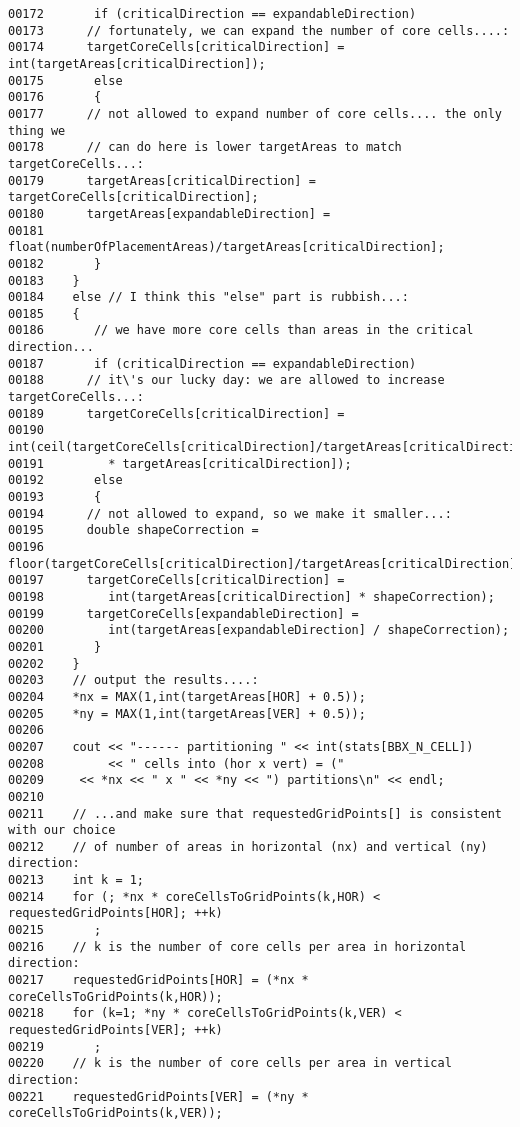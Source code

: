 \begin{verbatim}
00172       if (criticalDirection == expandableDirection)
00173      // fortunately, we can expand the number of core cells....:
00174      targetCoreCells[criticalDirection] = int(targetAreas[criticalDirection]);
00175       else
00176       {
00177      // not allowed to expand number of core cells.... the only thing we
00178      // can do here is lower targetAreas to match targetCoreCells...:
00179      targetAreas[criticalDirection] = targetCoreCells[criticalDirection];
00180      targetAreas[expandableDirection] =
00181         float(numberOfPlacementAreas)/targetAreas[criticalDirection];
00182       }
00183    }
00184    else // I think this "else" part is rubbish...:
00185    {
00186       // we have more core cells than areas in the critical direction...
00187       if (criticalDirection == expandableDirection)
00188      // it\'s our lucky day: we are allowed to increase targetCoreCells...:
00189      targetCoreCells[criticalDirection] =
00190         int(ceil(targetCoreCells[criticalDirection]/targetAreas[criticalDirection])
00191         * targetAreas[criticalDirection]);
00192       else
00193       {
00194      // not allowed to expand, so we make it smaller...:
00195      double shapeCorrection =
00196         floor(targetCoreCells[criticalDirection]/targetAreas[criticalDirection]);
00197      targetCoreCells[criticalDirection] =
00198         int(targetAreas[criticalDirection] * shapeCorrection);
00199      targetCoreCells[expandableDirection] =
00200         int(targetAreas[expandableDirection] / shapeCorrection);        
00201       }
00202    }
00203    // output the results....:
00204    *nx = MAX(1,int(targetAreas[HOR] + 0.5));
00205    *ny = MAX(1,int(targetAreas[VER] + 0.5));
00206 
00207    cout << "------ partitioning " << int(stats[BBX_N_CELL])
00208         << " cells into (hor x vert) = ("
00209     << *nx << " x " << *ny << ") partitions\n" << endl;
00210 
00211    // ...and make sure that requestedGridPoints[] is consistent with our choice
00212    // of number of areas in horizontal (nx) and vertical (ny) direction:
00213    int k = 1;
00214    for (; *nx * coreCellsToGridPoints(k,HOR) < requestedGridPoints[HOR]; ++k)
00215       ;
00216    // k is the number of core cells per area in horizontal direction:
00217    requestedGridPoints[HOR] = (*nx * coreCellsToGridPoints(k,HOR));
00218    for (k=1; *ny * coreCellsToGridPoints(k,VER) < requestedGridPoints[VER]; ++k)
00219       ;
00220    // k is the number of core cells per area in vertical direction:
00221    requestedGridPoints[VER] = (*ny * coreCellsToGridPoints(k,VER));

\end{verbatim}
